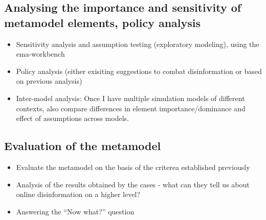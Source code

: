 \subsection{Analysing the importance and sensitivity of metamodel elements, policy analysis}
\begin{itemize}
	\item Sensitivity analysis and assumption testing (exploratory modeling), using the ema-workbench
	\item Policy analysis (either exisiting suggestions to combat disinformation or based on previous analysis)
	\item Inter-model analysis: Once I have multiple simulation models of different contexts, also compare differences in element importance/dominance and effect of assumptions across models.
\end{itemize}

\subsection{Evaluation of the metamodel}
\begin{itemize}
	\item Evaluate the metamodel on the basis of the criterea established previously
	\item Analysis of the results obtained by the cases - what can they tell us about online disinformation on a higher level?
	\item Answering the ``Now what?'' question
\end{itemize}